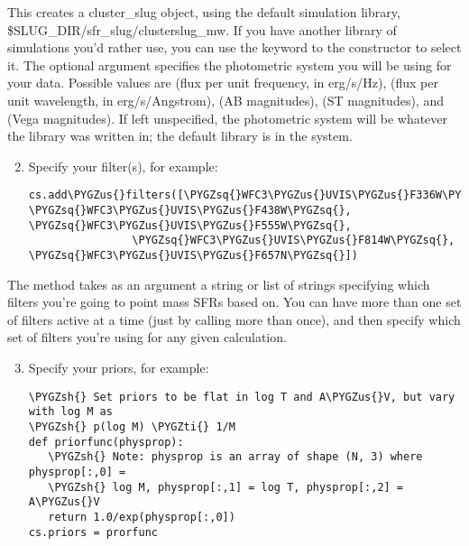 \documentclass[letterpaper,10pt,english]{sphinxmanual}
\def\PYGZus{\char`\_}
\def\PYGZsh{\char`\#}
\def\PYGZsq{\char`\'}
\def\PYGZti{\char`\~}
\renewcommand\PYGZsq{\textquotesingle}
\begin{document}
This creates a cluster\_slug object, using the default simulation library, \$SLUG\_DIR/sfr\_slug/clusterslug\_mw. If you have another library of simulations you'd rather use, you can use the  keyword to the  constructor to select it. The optional argument  specifies the photometric system you will be using for your data. Possible values are  (flux per unit frequency, in erg/s/Hz),  (flux per unit wavelength, in erg/s/Angstrom),  (AB magnitudes),  (ST magnitudes), and  (Vega magnitudes). If left unspecified, the photometric system will be whatever the library was written in; the default library is in the  system.
\begin{enumerate}
\setcounter{enumi}{1}
\item {} 
Specify your filter(s), for example:

\begin{Verbatim}[commandchars=\\\{\}]
cs.add\PYGZus{}filters([\PYGZsq{}WFC3\PYGZus{}UVIS\PYGZus{}F336W\PYGZsq{}, \PYGZsq{}WFC3\PYGZus{}UVIS\PYGZus{}F438W\PYGZsq{}, \PYGZsq{}WFC3\PYGZus{}UVIS\PYGZus{}F555W\PYGZsq{},
                \PYGZsq{}WFC3\PYGZus{}UVIS\PYGZus{}F814W\PYGZsq{}, \PYGZsq{}WFC3\PYGZus{}UVIS\PYGZus{}F657N\PYGZsq{}])
\end{Verbatim}

\end{enumerate}

The  method takes as an argument a string or list of strings specifying which filters you're going to point mass SFRs based on. You can have more than one set of filters active at a time (just by calling  more than once), and then specify which set of filters you're using for any given calculation.
\begin{enumerate}
\setcounter{enumi}{2}
\item {} 
Specify your priors, for example:

\begin{Verbatim}[commandchars=\\\{\}]
\PYGZsh{} Set priors to be flat in log T and A\PYGZus{}V, but vary with log M as
\PYGZsh{} p(log M) \PYGZti{} 1/M
def priorfunc(physprop):
   \PYGZsh{} Note: physprop is an array of shape (N, 3) where physprop[:,0] =
   \PYGZsh{} log M, physprop[:,1] = log T, physprop[:,2] = A\PYGZus{}V
   return 1.0/exp(physprop[:,0])
cs.priors = prorfunc
\end{Verbatim}

\end{enumerate}
\end{document}
